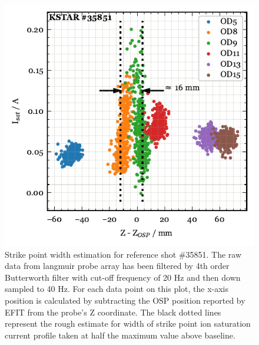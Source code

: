 \begin{figure}[!ht]
 \centering
 \includegraphics[width=\linewidth]{figures/StrikePointWidth.pdf}
 \caption{
Strike point width estimation for reference shot \#35851.
The raw data from langmuir probe array has been filtered by 4th order Butterworth filter with cut-off frequency of 20 Hz and then down sampled to 40 Hz.
For each data point on this plot, the x-axis position is calculated by subtracting the \ac{OSP} position reported by EFIT from the probe's Z coordinate.
The black dotted lines represent the rough estimate for width of strike point ion saturation current profile taken at half the maximum value above baseline.
}
 \label{fig:strike_point_width}
\end{figure}